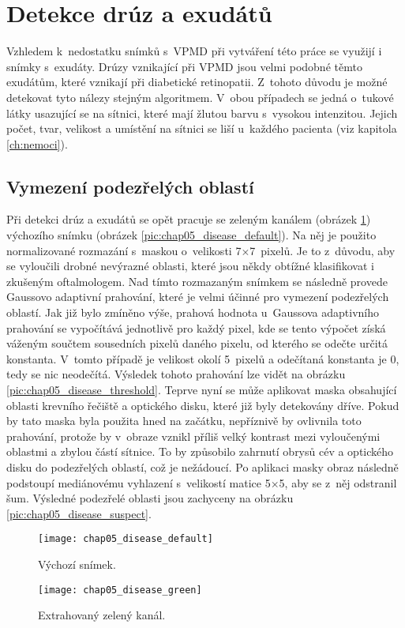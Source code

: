 \section{Detekce drúz a exudátů}
Vzhledem k~nedostatku snímků s~VPMD při vytváření této práce se využijí i snímky s~exudáty. Drúzy vznikající při VPMD jsou velmi podobné těmto exudátům, které vznikají při diabetické retinopatii. Z~tohoto důvodu je možné detekovat tyto nálezy stejným algoritmem. V~obou případech se jedná o~tukové látky usazující se na sítnici, které mají žlutou barvu s~vysokou intenzitou. Jejich počet, tvar, velikost a umístění na sítnici se liší u~každého pacienta (viz kapitola \ref{ch:nemoci}).

\subsection*{Vymezení podezřelých oblastí}
Při detekci drúz a exudátů se opět pracuje se zeleným kanálem (obrázek \ref{pic:chap05_disease_green}) výchozího snímku (obrázek \ref{pic:chap05_disease_default}). Na něj je použito normalizované rozmazání s~maskou o~velikosti 7$\times$7~pixelů. Je to z~důvodu, aby se vyloučili drobné nevýrazné oblasti, které jsou někdy obtížné klasifikovat i zkušeným oftalmologem. Nad tímto rozmazaným snímkem se následně provede Gaussovo adaptivní prahování, které je velmi účinné pro vymezení podezřelých oblastí. Jak již bylo zmíněno výše, prahová hodnota u~Gaussova adaptivního prahování se vypočítává jednotlivě pro každý pixel, kde se tento výpočet získá váženým součtem sousedních pixelů daného pixelu, od kterého se odečte určitá konstanta. V~tomto případě je velikost okolí 5~pixelů a odečítaná konstanta je 0, tedy se nic neodečítá. Výsledek tohoto prahování lze vidět na obrázku \ref{pic:chap05_disease_threshold}. Teprve nyní se může aplikovat maska obsahující oblasti krevního řečiště a optického disku, které již byly detekovány dříve. Pokud by tato maska byla použita hned na začátku, nepříznivě by ovlivnila toto prahování, protože by v~obraze vznikl příliš velký kontrast mezi vyloučenými oblastmi a zbylou částí sítnice. To by způsobilo zahrnutí obrysů cév a optického disku do podezřelých oblastí, což je nežádoucí. Po aplikaci masky obraz následně podstoupí mediánovému vyhlazení s~velikostí matice 5$\times$5, aby se z~něj odstranil šum. Výsledné podezřelé oblasti jsou zachyceny na obrázku \ref{pic:chap05_disease_suspect}.

\begin{figure}[h]
  \begin{minipage}[c]{0.47\textwidth}
    \texttt{[image: chap05\_disease\_default]}
    \caption{Výchozí snímek.}
    \label{pic:chap05_disease_default}
  \end{minipage}
  \hfill
  \begin{minipage}[c]{0.47\textwidth}
    \texttt{[image: chap05\_disease\_green]}
    \caption{Extrahovaný zelený kanál.}
    \label{pic:chap05_disease_green}
  \end{minipage}
\end{figure}

